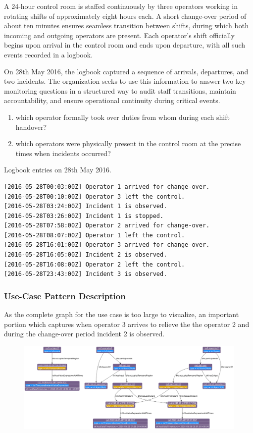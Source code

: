 A 24-hour control room is staffed continuously by three operators working in rotating shifts of approximately eight hours each. A short change-over period of about ten minutes ensures seamless transition between shifts, during which both incoming and outgoing operators are present. Each operator’s shift officially begins upon arrival in the control room and ends upon departure, with all such events recorded in a logbook.

On 28th May 2016, the logbook captured a sequence of arrivals, departures, and two incidents. The organization seeks to use this information to answer two key monitoring questions in a structured way to audit staff transitions, maintain accountability, and ensure operational continuity during critical events. 
\begin{enumerate}
    \item which operator formally took over duties from whom during each shift handover?
    \item which operators were physically present in the control room at the precise times when incidents occurred?
\end{enumerate}

Logbook entries on 28th May 2016.

\begin{verbatim}
[2016-05-28T00:03:00Z] Operator 1 arrived for change-over. 
[2016-05-28T00:10:00Z] Operator 3 left the control.
[2016-05-28T03:24:00Z] Incident 1 is observed.
[2016-05-28T03:26:00Z] Incident 1 is stopped.
[2016-05-28T07:58:00Z] Operator 2 arrived for change-over.
[2016-05-28T08:07:00Z] Operator 1 left the control.
[2016-05-28T16:01:00Z] Operator 3 arrived for change-over.
[2016-05-28T16:05:00Z] Incident 2 is observed.
[2016-05-28T16:08:00Z] Operator 2 left the control.
[2016-05-28T23:43:00Z] Incident 3 is observed.
\end{verbatim}

\subsubsection*{Use-Case Pattern Description}

As the complete graph for the use case is too large to visualize, an important portion which captures when operator 3 arrives to relieve the the operator 2 and during the change-over period incident 2 is observed.  

\begin{figure}[H]
    \centering
    \includegraphics[scale=0.29]{scenarios/role-gain-loss/images/use-case2.png}
\end{figure}

